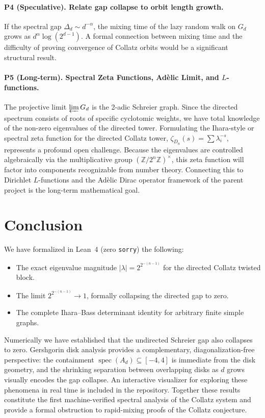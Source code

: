 \documentclass[12pt]{article}
\newcommand{\Z}{\mathbb{Z}}
\newcommand{\spec}{\operatorname{spec}}
\newcommand{\abs}[1]{\left\lvert #1 \right\rvert}
\begin{document}
\paragraph{P4 (Speculative). Relate gap collapse to orbit length growth.}
If the spectral gap $\Delta_d \sim d^{-\alpha}$, the mixing time of
the lazy random walk on $G_d$ grows as $d^\alpha \log(2^{d-1})$.  A
formal connection between mixing time and the difficulty of proving
convergence of Collatz orbits would be a significant structural result.

\paragraph{P5 (Long-term). Spectral Zeta Functions, Adèlic Limit, and $L$-functions.}
The projective limit $\varprojlim G_d$ is the 2-adic Schreier graph.
Since the directed spectrum consists of roots of specific cyclotomic weights, we have total knowledge of the non-zero eigenvalues of the directed tower. Formulating the Ihara-style or spectral zeta function for the directed Collatz tower, $\zeta_{D_n}(s) = \sum \lambda_i^{-s}$, represents a profound open challenge. Because the eigenvalues are controlled algebraically via the multiplicative group $(\Z/2^n\Z)^\times$, this zeta function will factor into components recognizable from number theory. Connecting this to Dirichlet $L$-functions and the Adèlic Dirac operator framework of the parent project is the long-term mathematical goal.

\section{Conclusion}

We have formalized in Lean~4 (zero \texttt{sorry}) the following:
\begin{itemize}
  \item The exact eigenvalue magnitude $\abs{\lambda} = 2^{2^{-(n-1)}}$
    for the directed Collatz twisted block.
  \item The limit $2^{2^{-(n-1)}} \to 1$, formally collapsing the
    directed gap to zero.
  \item The complete Ihara--Bass determinant identity for arbitrary
    finite simple graphs.
\end{itemize}
Numerically we have established that the undirected Schreier gap also
collapses to zero.  Gershgorin disk analysis provides a complementary,
diagonalization-free perspective: the containment
$\spec(A_d) \subseteq [-4,4]$ is immediate from the disk geometry,
and the shrinking separation between overlapping disks as $d$ grows
visually encodes the gap collapse.  An interactive visualizer for
exploring these phenomena in real time is included in the repository.
Together these results constitute the first machine-verified spectral
analysis of the Collatz system and provide a formal obstruction to
rapid-mixing proofs of the Collatz conjecture.
\end{document}
